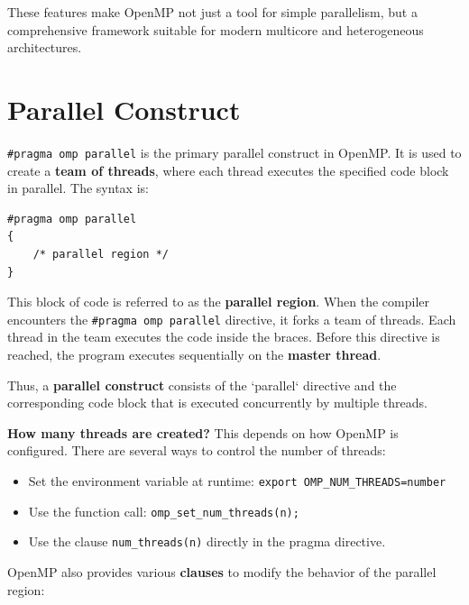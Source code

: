 \documentclass[12pt]{book}
\begin{document}
These features make OpenMP not just a tool for simple parallelism, but a comprehensive framework suitable for modern multicore and heterogeneous architectures.


\section{Parallel Construct}

\texttt{\#pragma omp parallel} is the primary parallel construct in OpenMP.  
It is used to create a \textbf{team of threads}, where each thread executes the specified code block in parallel. The syntax is:

\begin{lstlisting}[style=cppstyle]
#pragma omp parallel
{
    /* parallel region */
}
\end{lstlisting}

This block of code is referred to as the \textbf{parallel region}. When the compiler encounters the \texttt{\#pragma omp parallel} directive, it forks a team of threads. Each thread in the team executes the code inside the braces.  
Before this directive is reached, the program executes sequentially on the \textbf{master thread}.

Thus, a \textbf{parallel construct} consists of the `parallel` directive and the corresponding code block that is executed concurrently by multiple threads.

\vspace{0.5em}
\noindent
\textbf{How many threads are created?}
This depends on how OpenMP is configured. There are several ways to control the number of threads:

\begin{itemize}
    \item Set the environment variable at runtime: \texttt{export OMP\_NUM\_THREADS=number}
    \item Use the function call: \texttt{omp\_set\_num\_threads(n);}
    \item Use the clause \texttt{num\_threads(n)} directly in the pragma directive.
\end{itemize}

\vspace{0.5em}
\noindent
OpenMP also provides various \textbf{clauses} to modify the behavior of the parallel region:
\end{document}

